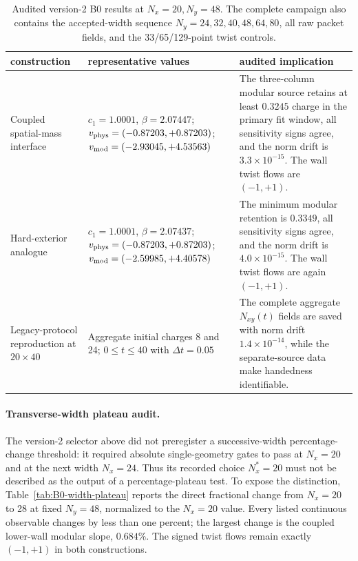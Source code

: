 \documentclass[aps,prx,twocolumn,floatfix,nofootinbib,superscriptaddress,longbibliography]{revtex4-2}
\newcommand{\campaignTableSetup}{%
  \footnotesize
  \setlength{\tabcolsep}{4pt}%
  \renewcommand{\arraystretch}{1.12}%
}
\begin{document}
\begin{table}[t]
\campaignTableSetup
\caption{Audited version-2 B0 results at $N_x=20,N_y=48$.  The complete campaign also
contains the accepted-width sequence $N_y=24,32,40,48,64,80$, all raw packet fields, and
the 33/65/129-point twist controls.}
\label{tab:B0-current}
\begin{tabularx}{\textwidth}{@{}L{0.80}L{1.00}L{1.20}@{}}
\toprule
construction & representative values & audited implication \\
\midrule
Coupled spatial-mass interface
& $c_1=1.0001$, $\beta=2.07447$;
$v_{\rm phys}=(-0.87203,+0.87203)$;
$v_{\rm mod}=(-2.93045,+4.53563)$
& The three-column modular source retains at least $0.3245$ charge in the primary fit
window, all sensitivity signs agree, and the norm drift is $3.3\times10^{-15}$.
The wall twist flows are $(-1,+1)$. \\
Hard-exterior analogue
& $c_1=1.0001$, $\beta=2.07437$;
$v_{\rm phys}=(-0.87203,+0.87203)$;
$v_{\rm mod}=(-2.59985,+4.40578)$
& The minimum modular retention is $0.3349$, all sensitivity signs agree, and the norm
drift is $4.0\times10^{-15}$.  The wall twist flows are again $(-1,+1)$. \\
Legacy-protocol reproduction at $20\times40$
& Aggregate initial charges 8 and 24; $0\leq t\leq40$ with $\Delta t=0.05$
& The complete aggregate $N_{xy}(t)$ fields are saved with norm drift
$1.4\times10^{-14}$, while the separate-source data make handedness identifiable. \\
\bottomrule
\end{tabularx}
\end{table}

\paragraph*{Transverse-width plateau audit.}
The version-2 selector above did not preregister a successive-width percentage-change
threshold: it required absolute single-geometry gates to pass at $N_x=20$ and at the next
width $N_x=24$.  Thus its recorded choice $N_x^*=20$ must not be described as the output
of a percentage-plateau test.  To expose the distinction, Table~\ref{tab:B0-width-plateau}
reports the direct fractional change from $N_x=20$ to 28 at fixed $N_y=48$, normalized to
the $N_x=20$ value.  Every listed continuous observable changes by less than one percent;
the largest change is the coupled lower-wall modular slope, $0.684\%$.  The signed twist
flows remain exactly $(-1,+1)$ in both constructions.
\end{document}
